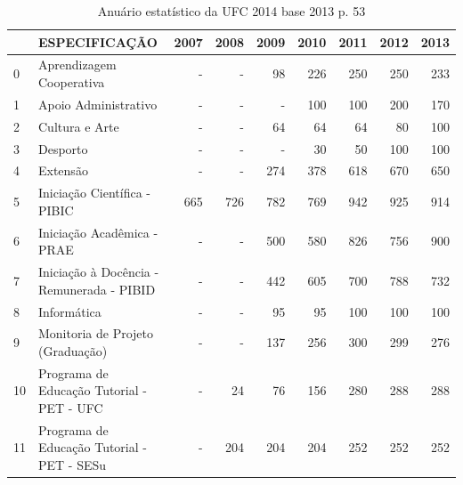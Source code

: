 \documentclass{report}
\begin{document}
\begin{table}[H]
\begin{tabular}{llrrrrrrr}
\toprule
{} &                               ESPECIFICAÇÃO &  2007 &  2008 &  2009 &  2010 &  2011 &  2012 &  2013 \\
\midrule
0  &                    Aprendizagem Cooperativa &     - &     - &    98 &   226 &   250 &   250 &   233 \\
1  &                        Apoio Administrativo &     - &     - &     - &   100 &   100 &   200 &   170 \\
2  &                              Cultura e Arte &     - &     - &    64 &    64 &    64 &    80 &   100 \\
3  &                                    Desporto &     - &     - &     - &    30 &    50 &   100 &   100 \\
4  &                                    Extensão &     - &     - &   274 &   378 &   618 &   670 &   650 \\
5  &                Iniciação Científica - PIBIC &   665 &   726 &   782 &   769 &   942 &   925 &   914 \\
6  &                  Iniciação Acadêmica - PRAE &     - &     - &   500 &   580 &   826 &   756 &   900 \\
7  &   Iniciação à Docência - Remunerada - PIBID &     - &     - &   442 &   605 &   700 &   788 &   732 \\
8  &                                 Informática &     - &     - &    95 &    95 &   100 &   100 &   100 \\
9  &            Monitoria de Projeto (Graduação) &     - &     - &   137 &   256 &   300 &   299 &   276 \\
10 &   Programa de Educação Tutorial - PET - UFC &     - &    24 &    76 &   156 &   280 &   288 &   288 \\
11 &  Programa de Educação Tutorial - PET - SESu &     - &   204 &   204 &   204 &   252 &   252 &   252 \\
\bottomrule
\end{tabular}
\caption{Anuário estatístico da UFC 2014 base 2013 p. 53}
\label{table:numero_bolsas_graduacao-ufc}
\end{table}
\end{document}
